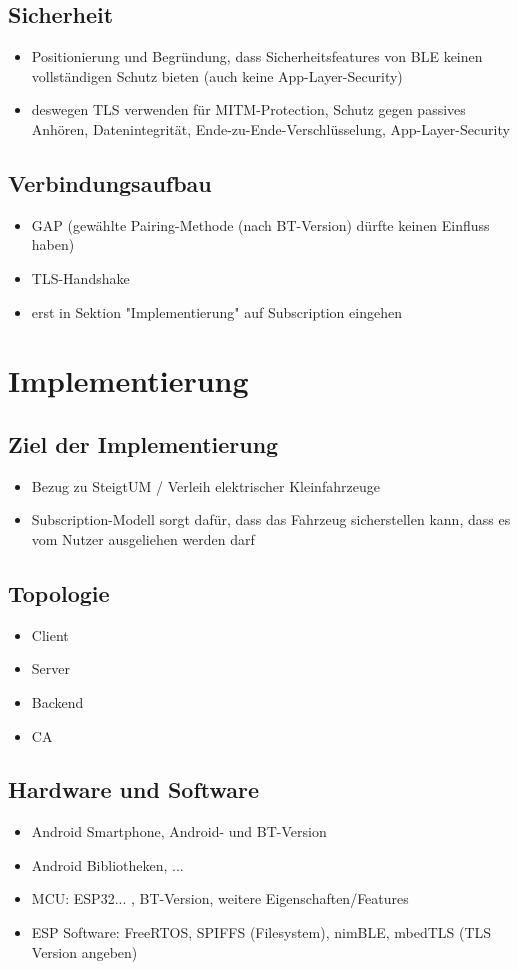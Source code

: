 \documentclass[doktyp=barbeit]{TUBAFarbeiten}
\begin{document}
\subsection{Sicherheit}
\begin{itemize}
	\item Positionierung und Begründung, dass Sicherheitsfeatures von BLE keinen vollständigen Schutz bieten (auch keine App-Layer-Security)
	\item deswegen TLS verwenden für MITM-Protection, Schutz gegen passives Anhören, Datenintegrität, Ende-zu-Ende-Verschlüsselung, App-Layer-Security
\end{itemize}
\subsection{Verbindungsaufbau}
\begin{itemize}
	\item GAP (gewählte Pairing-Methode (nach BT-Version) dürfte keinen Einfluss haben)
	\item TLS-Handshake
	\item erst in Sektion "Implementierung" auf Subscription eingehen
\end{itemize}

\section{Implementierung}
\subsection{Ziel der Implementierung}
\begin{itemize}
	\item Bezug zu SteigtUM / Verleih elektrischer Kleinfahrzeuge
	\item Subscription-Modell sorgt dafür, dass das Fahrzeug sicherstellen kann, dass es vom Nutzer ausgeliehen werden darf
\end{itemize}
\subsection{Topologie}
\begin{itemize}
	\item Client
	\item Server
	\item Backend
	\item CA
\end{itemize}
\subsection{Hardware und Software}
\begin{itemize}
	\item Android Smartphone, Android- und BT-Version
	\item Android Bibliotheken, ...
	\item MCU: ESP32... , BT-Version, weitere Eigenschaften/Features
	\item ESP Software: FreeRTOS, SPIFFS (Filesystem), nimBLE, mbedTLS (TLS Version angeben)
\end{itemize}
\end{document}
